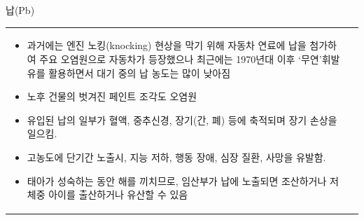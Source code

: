 \begin{frame}[t]{납(Pb)	}
	\begin{tabular}{ll}
		\begin{minipage}[t]{0.475\textwidth}\scriptsize
			\begin{itemize}
				\item 과거에는 엔진 노킹(knocking) 현상을 막기 위해 자동차 연료에 납을 첨가하여 주요 오염원으로 자동차가 등장했으나 최근에는 1970년대 이후 ‘무연’휘발유를 활용하면서 대기 중의 납 농도는 많이 낮아짐
				\item 노후 건물의 벗겨진 페인트 조각도 오염원
				\item 유입된 납의 일부가 혈액, 중추신경, 장기(간, 폐) 등에 축적되며 장기 손상을 일으킴.
				\item 고농도에 단기간 노출시, 지능 저하, 행동 장애, 심장 질환, 사망을 유발함. 
				\item 태아가 성숙하는 동안 해를 끼치므로, 임산부가 납에 노출되면 조산하거나 저체중 아이를  출산하거나 유산할 수 있음
			\end{itemize}
		\end{minipage}	
		&
		\begin{minipage}[t]{0.475\textwidth} \scriptsize	
			
		\end{minipage}
	\end{tabular}
\end{frame}


